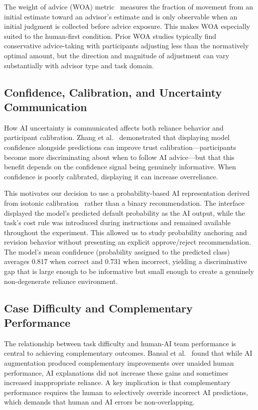 \documentclass[conference]{IEEEtran}
\begin{document}
The weight of advice (WOA) metric~\cite{bonaccio2006advice,harvey1997taking}
measures the fraction of movement from an initial estimate toward an
advisor's estimate and is only observable when an initial judgment is
collected before advice exposure. This makes WOA especially suited to the
human-first condition. Prior WOA studies typically find conservative
advice-taking with participants adjusting less than the normatively optimal
amount, but the direction and magnitude of adjustment can vary
substantially with advisor type and task domain.

\subsection{Confidence, Calibration, and Uncertainty Communication}

How AI uncertainty is communicated affects both reliance behavior and
participant calibration. Zhang et al.~\cite{zhang2020effect} demonstrated
that displaying model confidence alongside predictions can improve trust
calibration---participants become more discriminating about when to follow
AI advice---but that this benefit depends on the confidence signal being
genuinely informative. When confidence is poorly calibrated, displaying it
can increase overreliance.

This motivates our decision to use a probability-based AI representation
derived from isotonic calibration~\cite{niculescu2005predicting} rather
than a binary recommendation. The interface displayed the model's
predicted default probability as the AI output, while the task's cost rule
was introduced during instructions and remained available throughout the
experiment. This allowed us to study probability anchoring and revision
behavior without presenting an explicit approve/reject recommendation. The
model's mean confidence (probability assigned to the predicted class)
averages 0.817 when correct and 0.731 when incorrect, yielding a
discriminative gap that is large enough to be informative but small
enough to create a genuinely non-degenerate reliance environment.

\subsection{Case Difficulty and Complementary Performance}

The relationship between task difficulty and human-AI team performance
is central to achieving complementary outcomes. Bansal et
al.~\cite{bansal2021does} found that while AI augmentation produced
complementary improvements over unaided human performance, AI
explanations did not increase these gains and sometimes increased
inappropriate reliance. A key implication is that complementary
performance requires the human to selectively override incorrect AI
predictions, which demands that human and AI errors be non-overlapping.
\end{document}
